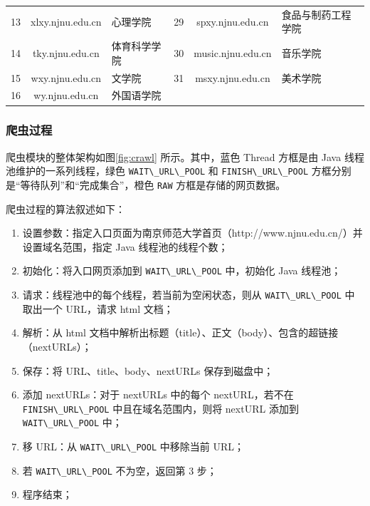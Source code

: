 \documentclass{ctexart}
\newcommand{\code}[1]{\colorbox{backcolor}{\lstinline|#1|}}
\begin{document}
\begin{table}[h]
{\begin{tabular}{ccl|ccl}
                13 & xlxy.njnu.edu.cn   & 心理学院            & 29 & spxy.njnu.edu.cn     & 食品与制药工程学院           \\
                14 & tky.njnu.edu.cn    & 体育科学学院          & 30 & music.njnu.edu.cn    & 音乐学院                \\
                15 & wxy.njnu.edu.cn    & 文学院             & 31 & msxy.njnu.edu.cn     & 美术学院                \\
                16 & wy.njnu.edu.cn     & 外国语学院           &    &                      &                     \\ \hline
            \end{tabular}
        }
    \end{table}

    \subsubsection{爬虫过程}\label{subsubsec:crawl_run}

    爬虫模块的整体架构如图\ref{fig:crawl} 所示。其中，蓝色 Thread 方框是由 Java 线程池维护的一系列线程，绿色 \code{WAIT\_URL\_POOL} 和 \code{FINISH\_URL\_POOL} 方框分别是“等待队列”和“完成集合”，橙色 \code{RAW} 方框是存储的网页数据。

    爬虫过程的算法叙述如下：

    \begin{enumerate}
        \item 设置参数：指定入口页面为南京师范大学首页（http://www.njnu.edu.cn/）并设置域名范围，指定 Java 线程池的线程个数；
        \item 初始化：将入口网页添加到 \code{WAIT\_URL\_POOL} 中，初始化 Java 线程池；
        \item 请求：线程池中的每个线程，若当前为空闲状态，则从 \code{WAIT\_URL\_POOL} 中取出一个 URL，请求 html 文档；
        \item 解析：从 html 文档中解析出标题（title）、正文（body）、包含的超链接（nextURLs）；
        \item 保存：将 URL、title、body、nextURLs 保存到磁盘中；
        \item 添加 nextURLs：对于 nextURLs 中的每个 nextURL，若不在 \code{FINISH\_URL\_POOL} 中且在域名范围内，则将 nextURL 添加到 \code{WAIT\_URL\_POOL} 中；
        \item 移 URL：从 \code{WAIT\_URL\_POOL} 中移除当前 URL；
        \item 若 \code{WAIT\_URL\_POOL} 不为空，返回第 3 步；
        \item 程序结束；
    \end{enumerate}
\end{document}
